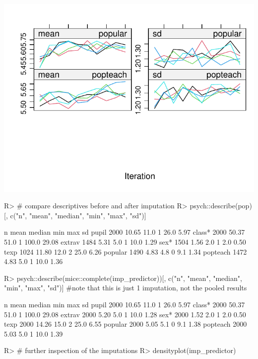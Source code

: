 \documentclass[
]{jss}
\begin{document}
\begin{CodeChunk}
\begin{center}\includegraphics{Manuscript_files/figure-latex/pop-predictor-2} \end{center}

\begin{CodeInput}
R> # compare descriptives before and after imputation
R> psych::describe(pop)[, c("n", "mean", "median", "min", "max", "sd")]
\end{CodeInput}
\begin{CodeOutput}
            n  mean median min   max    sd
pupil    2000 10.65   11.0   1  26.0  5.97
class*   2000 50.37   51.0   1 100.0 29.08
extrav   1484  5.31    5.0   1  10.0  1.29
sex*     1504  1.56    2.0   1   2.0  0.50
texp     1024 11.80   12.0   2  25.0  6.26
popular  1490  4.83    4.8   0   9.1  1.34
popteach 1472  4.83    5.0   1  10.0  1.36
\end{CodeOutput}
\begin{CodeInput}
R> psych::describe(mice::complete(imp_predictor))[, c("n", "mean", "median", "min", "max", "sd")] #note that this is just 1 imputation, not the pooled results
\end{CodeInput}
\begin{CodeOutput}
            n  mean median min   max    sd
pupil    2000 10.65   11.0   1  26.0  5.97
class*   2000 50.37   51.0   1 100.0 29.08
extrav   2000  5.20    5.0   1  10.0  1.28
sex*     2000  1.52    2.0   1   2.0  0.50
texp     2000 14.26   15.0   2  25.0  6.55
popular  2000  5.05    5.1   0   9.1  1.38
popteach 2000  5.03    5.0   1  10.0  1.39
\end{CodeOutput}
\begin{CodeInput}
R> # further inspection of the imputations
R> densityplot(imp_predictor)
\end{CodeInput}



\end{CodeChunk}
\end{document}
